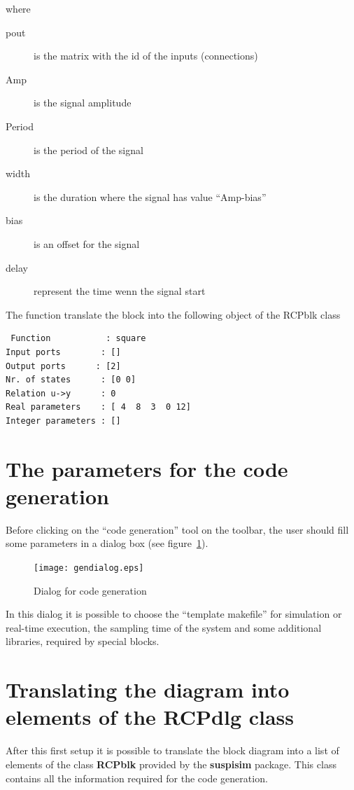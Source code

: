  where
 
 \begin{description}
 \item[pout] is the matrix with the id of the inputs (connections)
 \item [Amp] is the signal amplitude
 \item [Period] is the period of the signal
 \item [width] is the duration where the signal has value ``Amp-bias''
 \item [bias] is an offset for the signal
 \item [delay] represent the time wenn the signal start
 \end{description}
 
 The function translate the block into the following object of the RCPblk class
 
 \begin{verbatim}
 Function           : square
Input ports        : []
Output ports      : [2]
Nr. of states      : [0 0]
Relation u->y      : 0
Real parameters    : [ 4  8  3  0 12]
Integer parameters : []
\end{verbatim}

\section{The parameters for the code generation}

Before clicking on the ``code generation'' tool on the toolbar, the user should 
fill some parameters in a dialog box (see figure~\ref{codedlg}).

 \begin{figure}[htbp]	%
 \centering
 \texttt{[image: gendialog.eps]}
 \caption{Dialog for code generation}
 \label{codedlg}
 \end{figure}

In this dialog it is possible to choose the ``template makefile'' for 
simulation or real-time execution, the sampling time of the system and some 
additional libraries, required by special blocks.

\section{Translating the diagram into elements of the RCPdlg class}
\label{Sect-IO}

After this first setup it is possible to translate the block diagram into a 
list of elements of the class \textbf{RCPblk} provided by the 
\textbf{suspisim} package. This class contains all the information required 
for the code generation.

